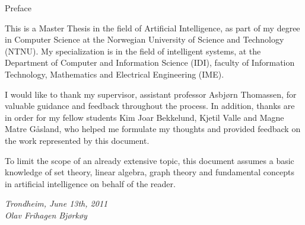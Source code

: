 \null\vspace{5em}
{
  \centering
  \normalfont
  \huge
  Preface\\
}
\vspace{2em}

This is a Master Thesis in the field of Artificial Intelligence,
as part of my degree in Computer Science
at the Norwegian University of Science and Technology (NTNU).
My specialization is in the field of intelligent systems, 
at the Department of Computer and Information Science (IDI), 
faculty of Information Technology, Mathematics and Electrical Engineering (IME).

I would like to thank my supervisor, assistant professor Asbjørn Thomassen, for valuable guidance and feedback throughout the process.
In addition, thanks are in order for my fellow students 
Kim Joar Bekkelund, Kjetil Valle and Magne Matre Gåsland,
who helped me formulate my thoughts and provided feedback on the work represented by this document.

To limit the scope of an already extensive topic, this document assumes a basic knowledge of set theory, 
linear algebra, graph theory and fundamental concepts in artificial intelligence on behalf of the reader.

\vspace{1em}
\begin{center}
  \color{red}
  \itshape
  Trondheim, June 13th, 2011\\
  Olav Frihagen Bjørkøy\\
\end{center}

\clearpage

